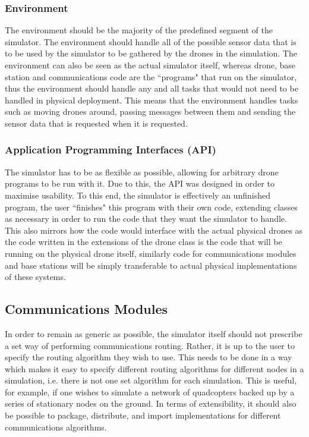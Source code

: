 \subsubsection{Environment}
The environment should be the majority of the predefined segment of the simulator. The environment should handle all of the possible sensor data that is to be used by the simulator to be gathered by the drones in the simulation. The environment can also be seen as the actual simulator itself, whereas drone, base station and communications code are the ``programs" that run on the simulator, thus the environment should handle any and all tasks that would not need to be handled in physical deployment. This means that the environment handles tasks such as moving drones around, passing messages between them and sending the sensor data that is requested when it is requested.

\subsubsection{Application Programming Interfaces (API)}
The simulator has to be as flexible as possible, allowing for arbitrary drone programs to be run with it. Due to this, the API was designed in order to maximise usability. To this end, the simulator is effectively an unfinished program, the user ``finishes" this program with their own code, extending classes as necessary in order to run the code that they want the simulator to handle. This also mirrors how the code would interface with the actual physical drones as the code written in the extensions of the drone class is the code that will be running on the physical drone itself, similarly code for communications modules and base stations will be simply transferable to actual physical implementations of these systems.

\subsection{Communications Modules}
In order to remain as generic as possible, the simulator itself should not prescribe a set way of performing communications routing. Rather, it is up to the user to specify the routing algorithm they wish to use. This needs to be done in a way which makes it easy to specify different routing algorithms for different nodes in a simulation, i.e. there is not one set algorithm for each simulation. This is useful, for example, if one wishes to simulate a network of quadcopters backed up by a series of stationary nodes on the ground. In terms of extensibility, it should also be possible to package, distribute, and import implementations for different communications algorithms.

